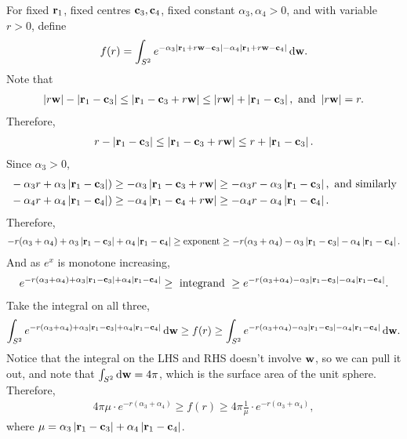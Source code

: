 \documentclass[12pt]{article}
\begin{document}
For fixed \(\vr_1\), fixed centres \(\vc_3, \vc_4\), fixed constant \(\alpha_3, \alpha_4 > 0\), and with variable \(r > 0\), define
\begin{align*}
    f(r) = \int_{S^2} e^{-\alpha_3|\vr_1 + r\vw - \vc_3|-\alpha_4|\vr_1 + r\vw - \vc_4|} \diff \vw.
\end{align*}
Note that 
\begin{align*}
    \abs{r\vw} - \abs{\vr_1 - \vc_3}\leq \abs{\vr_1 - \vc_3 + r\vw} \leq \abs{r\vw} + \abs{\vr_1 - \vc_3}, \text{ and } \abs{r\vw} = r.
\end{align*}
Therefore,
\begin{align*}
    r - \abs{\vr_1 - \vc_3} \leq \abs{\vr_1 - \vc_3 + r\vw} \leq r + \abs{\vr_1 - \vc_3}.
\end{align*}
Since \(\alpha_3 > 0\),
\begin{align*}
    &-\alpha_3r + \alpha_3\abs{\vr_1 - \vc_3})  \geq -\alpha_3\abs{\vr_1 - \vc_3 + r\vw} \geq -\alpha_3r - \alpha_3 \abs{\vr_1 - \vc_3}, \text{ and similarly}\\
    &-\alpha_4r + \alpha_4\abs{\vr_1 - \vc_4})  \geq -\alpha_4\abs{\vr_1 - \vc_4 + r\vw} \geq -\alpha_4r - \alpha_4 \abs{\vr_1 - \vc_4}.
\end{align*}
Therefore,
\begin{align*}
    -r(\alpha_3 + \alpha_4) + \alpha_3 \abs{\vr_1 - \vc_3} + \alpha_4\abs{\vr_1 - \vc_4} \geq \text{exponent} \geq -r(\alpha_3 + \alpha_4) - \alpha_3 \abs{\vr_1 - \vc_3} - \alpha_4 \abs{\vr_1 - \vc_4}.
\end{align*}
And as \(e^x\) is monotone increasing,
\begin{align*}
    e^{-r(\alpha_3 + \alpha_4) + \alpha_3 \abs{\vr_1 - \vc_3} + \alpha_4\abs{\vr_1 - \vc_4}} \geq \text{ integrand } \geq e^{-r(\alpha_3 + \alpha_4) - \alpha_3 \abs{\vr_1 - \vc_3} - \alpha_4 \abs{\vr_1 - \vc_4}}.
\end{align*}
Take the integral on all three,
\begin{align*}
    \int_{S^2} e^{-r(\alpha_3 + \alpha_4) + \alpha_3 \abs{\vr_1 - \vc_3} + \alpha_4\abs{\vr_1 - \vc_4}}\diff \vw \geq f(r) \geq \int_{S^2} e^{-r(\alpha_3 + \alpha_4) - \alpha_3 \abs{\vr_1 - \vc_3} - \alpha_4 \abs{\vr_1 - \vc_4}}\diff \vw.
\end{align*}
Notice that the integral on the LHS and RHS doesn't involve \(\vw\), so we can pull it out, and note that \(\int_{S^2} \diff \vw = 4 \pi\), which is the surface area of the unit sphere.
Therefore,
\begin{align*}
    \boxed{4\pi \mu \cdot e^{-r(\alpha_3 + \alpha_4)} \geq f(r) \geq 4 \pi \frac{1}{\mu} \cdot e^{-r(\alpha_3 + \alpha_4)},}
\end{align*}
    where \(\mu = \alpha_3 \abs{\vr_1 - \vc_3} + \alpha_4 \abs{\vr_1 - \vc_4}\).
\end{document}
